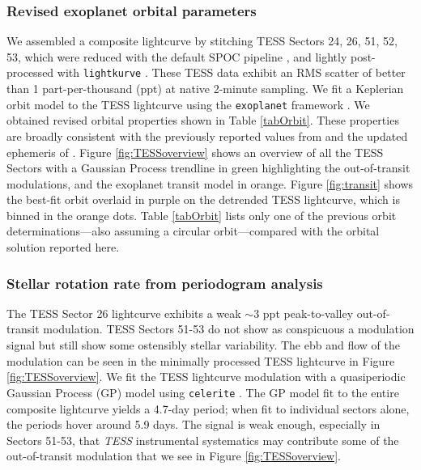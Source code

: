 \documentclass[linenumbers, twocolumn, trackchanges]{aastex631}
\begin{document}
\subsubsection{Revised exoplanet orbital parameters}
We assembled a composite lightcurve by stitching TESS Sectors 24, 26, 51, 52, 53, which were reduced with the default SPOC pipeline \citep{2020RNAAS...4..201C}, and lightly post-processed with \texttt{lightkurve} \citep{geert_barentsen_2019_2565212}.  These TESS data exhibit an RMS scatter of better than 1 part-per-thousand (ppt) at native 2-minute sampling.  We fit a Keplerian orbit model to the TESS lightcurve using the \texttt{exoplanet} framework \citep{exoplanet:joss}.  We obtained revised orbital properties shown in Table \ref{tabOrbit}.  These properties are broadly consistent with the previously reported values from \citet{2017AJ....153..211Z} and the updated ephemeris of \citet{2022ApJS..259...62I}.  Figure \ref{fig:TESSoverview} shows an overview of all the TESS Sectors with a Gaussian Process trendline in green highlighting the out-of-transit modulations, and the exoplanet transit model in orange.  Figure \ref{fig:transit} shows the best-fit orbit overlaid in purple on the detrended TESS lightcurve, which is binned in the orange dots.  Table \ref{tabOrbit} lists only one of the previous orbit determinations---also assuming a circular orbit---compared with the orbital solution reported here.

\subsubsection{Stellar rotation rate from periodogram analysis}\label{TESSmodulation}

The TESS Sector 26 lightcurve exhibits a weak $\sim$3 ppt peak-to-valley out-of-transit modulation. TESS Sectors 51-53 do not show as conspicuous a modulation signal but still show some ostensibly stellar variability.  The ebb and flow of the modulation can be seen in the minimally processed TESS lightcurve in Figure \ref{fig:TESSoverview}.  We fit the TESS lightcurve modulation with a quasiperiodic Gaussian Process (GP) model using \texttt{celerite} \citep{celerite1,celerite2}.  The GP model fit to the entire composite lightcurve yields a 4.7-day period; when fit to individual sectors alone, the periods hover around 5.9 days.  The signal is weak enough, especially in Sectors 51-53, that \emph{TESS} instrumental systematics may contribute some of the out-of-transit modulation that we see in Figure \ref{fig:TESSoverview}.
\end{document}
